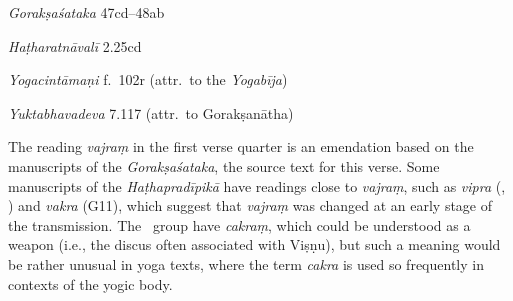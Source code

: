 \begin{ekdosis}
\begin{sources}[hp02_067]
\emph{Gorakṣaśataka} 47cd–48ab

\begin{versinnote}
\end{versinnote}
\end{sources}

\begin{testimonia}[hp02_067]
\emph{Haṭharatnāvalī} 2.25cd

\begin{versinnote}
\end{versinnote}

\emph{Yogacintāmaṇi} f.~102r (attr.~to the \emph{Yogabīja})

\begin{versinnote}
\end{versinnote}


\emph{Yuktabhavadeva} 7.117 (attr.~to Gorakṣanātha)

\begin{versinnote}
\end{versinnote}
\end{testimonia}

\begin{philcomm}[hp02_067]
The reading \emph{vajraṃ} in the first verse quarter is an emendation based on the manuscripts of the \emph{Gorakṣaśataka}, the source text for this verse. Some manuscripts of the \emph{Haṭhapradīpikā} have readings close to \emph{vajraṃ}, such as \emph{vipra} (, ) and \emph{vakra} (G11), which suggest that \emph{vajraṃ} was changed at an early stage of the transmission. The \textalpha\ group have \emph{cakraṃ}, which could be understood as a weapon (i.e., the discus often associated with Viṣṇu), but such a meaning would be rather unusual in yoga texts, where the term \emph{cakra} is used so frequently in contexts of the yogic body.
\end{philcomm}


\end{ekdosis}

